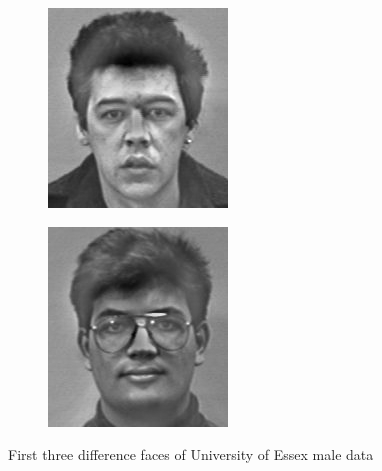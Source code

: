 \begin{figure}
\begin{subfigure}[b]{0.3\textwidth}
\includegraphics[width=\textwidth]{differenceFace1.png}
\end{subfigure}
\begin{subfigure}[b]{0.3\textwidth}
\includegraphics[width=\textwidth]{differenceFace2.png}
\end{subfigure}
\caption{First three difference faces of University of Essex male data}
\label{facialRecognition:differenceFaces}
\end{figure}

